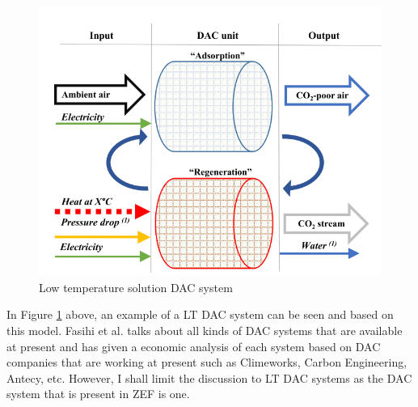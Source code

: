 \begin{figure}[H]
    \centering
    \includegraphics[scale = 0.6]{images/LT_DAC.png}
    \caption{Low temperature solution DAC system}
    \label{fig:LTDAC}
\end{figure}

\noindent
In Figure \ref{fig:LTDAC} above, an example of a LT DAC system can be seen and based on this model. Fasihi et al. talks about all kinds of DAC systems that are available at present and has given a economic analysis of each system based on DAC companies that are working at present such as Climeworks, Carbon Engineering, Antecy, etc. However, I shall limit the discussion to LT DAC systems as the DAC system that is present in ZEF is one. 


